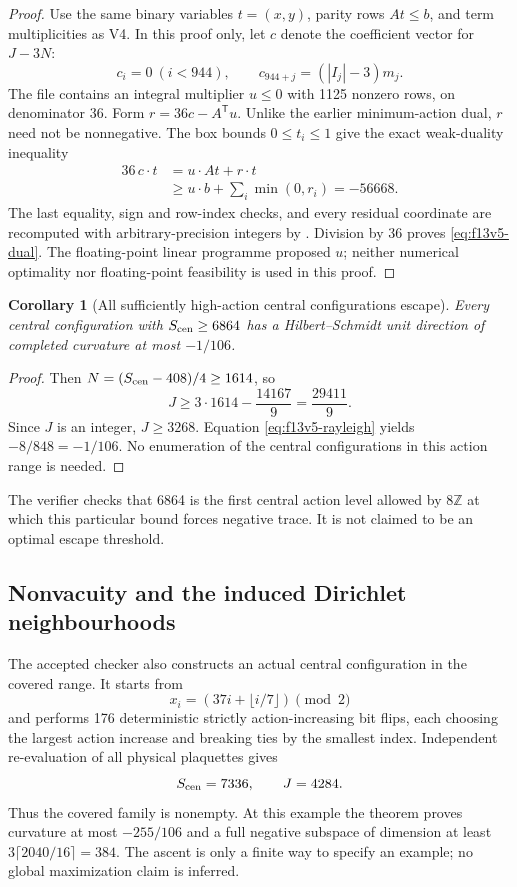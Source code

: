 \documentclass[11pt,oneside]{article}
\newtheorem{corollary}[theorem]{Corollary}
\begin{document}
\begin{proof}
Use the same binary variables \(t=(x,y)\), parity
rows \(At\le b\), and term multiplicities as V4.
In this proof only, let \(c\) denote the coefficient
vector for \(J-3N\):
\[
 c_i=0\ (i<944),\qquad
 c_{944+j}=(|I_j|-3)m_j .
\]
The file
contains an integral multiplier \(u\le0\) with
1125 nonzero rows, on denominator 36.
Form \(r=36c-A^{\mathsf T}u\). Unlike the earlier
minimum-action dual, \(r\) need not be nonnegative.
The box bounds \(0\le t_i\le1\) give the exact
weak-duality inequality
\begin{align*}
 36\,c\cdot t
 &=u\cdot At+r\cdot t\\
 &\ge u\cdot b+\sum_i\min(0,r_i)
 =-56668 .
\end{align*}
The last equality, sign and row-index checks, and
every residual coordinate are recomputed with
arbitrary-precision integers by
.
Division by 36 proves \eqref{eq:f13v5-dual}.
The floating-point linear programme proposed \(u\);
neither numerical optimality nor floating-point
feasibility is used in this proof.
\end{proof}

\begin{corollary}[All sufficiently high-action central configurations escape]
\label{cor:f13v5-high}
Every central configuration with \(S_{\rm cen}\ge6864\)
has a Hilbert--Schmidt unit direction of completed
curvature at most \(-1/106\).
\end{corollary}

\begin{proof}
Then \(N=(S_{\rm cen}-408)/4\ge1614\), so
\[
 J\ge3\cdot1614-\frac{14167}{9}
   =\frac{29411}{9}.
\]
Since \(J\) is an integer, \(J\ge3268\). Equation
\eqref{eq:f13v5-rayleigh} yields
\(-8/848=-1/106\). No enumeration of the central
configurations in this action range is needed.
\end{proof}

The verifier checks that 6864 is the first central
action level allowed by \(8\mathbb Z\) at which this
particular bound forces negative trace. It is not
claimed to be an optimal escape threshold.

\subsection{Nonvacuity and the induced Dirichlet neighbourhoods}

The accepted checker also constructs an actual
central configuration in the covered range. It
starts from
\[
 x_i=(37i+\lfloor i/7\rfloor)\pmod2
\]
and performs 176 deterministic strictly action-increasing
bit flips, each choosing the largest action increase
and breaking ties by the smallest index. Independent
re-evaluation of all physical plaquettes gives
\[
 S_{\rm cen}=7336,\qquad J=4284.
\]
Thus the covered family is nonempty. At this example
the theorem proves curvature at most \(-255/106\)
and a full negative subspace of dimension at least
\(3\lceil2040/16\rceil=384\). The ascent is only a
finite way to specify an example; no global
maximization claim is inferred.
\end{document}
